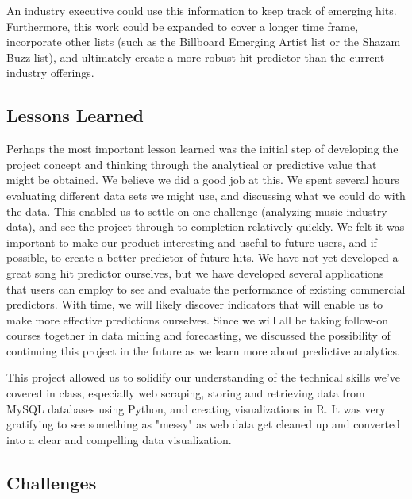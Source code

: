 \documentclass{article}
\begin{document}
\noindent
An industry executive could use this information to keep track of emerging hits. Furthermore, this work could be expanded to cover a longer time frame, incorporate other lists (such as the Billboard Emerging Artist list or the Shazam Buzz list), and ultimately create a more robust hit predictor than the current industry offerings. 

\subsection{Lessons Learned}

Perhaps the most important lesson learned was the initial step of developing the project concept and thinking through the analytical or predictive value that might be obtained.  We believe we did a good job at this. We spent several hours evaluating different data sets we might use, and discussing what we could do with the data.  This enabled us to settle on one challenge (analyzing music industry data), and see the project through to completion relatively quickly.  We felt it was important to make our product interesting and useful to future users, and if possible, to create a better predictor of future hits. We have not yet developed a great song hit predictor ourselves, but we have developed several applications that users can employ to see and evaluate the performance of existing commercial predictors.  With time, we will likely discover indicators that will enable us to make more effective predictions ourselves.  Since we will all be taking follow-on courses together in data mining and forecasting, we discussed the possibility of continuing this project in the future as we learn more about predictive analytics.  \vspace{2mm} 

\noindent
This project allowed us to solidify our understanding of the technical skills we've covered in class, especially web scraping, storing and retrieving data from MySQL databases using Python, and creating visualizations in R. It was very gratifying to see something as "messy" as web data get cleaned up and converted into a clear and compelling data visualization.  


\subsection{Challenges}
\end{document}
